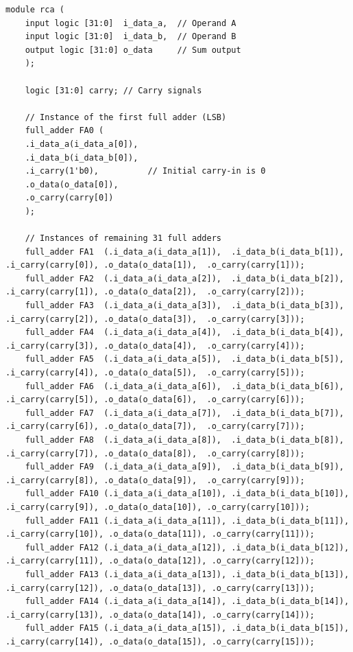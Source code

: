 \begin{lstlisting}[style = SystemVerilog, caption={RCA}]
	module rca (
	input logic [31:0]  i_data_a,  // Operand A
	input logic [31:0]  i_data_b,  // Operand B
	output logic [31:0] o_data     // Sum output
	);
	
	logic [31:0] carry; // Carry signals
	
	// Instance of the first full adder (LSB)
	full_adder FA0 (
	.i_data_a(i_data_a[0]),
	.i_data_b(i_data_b[0]),
	.i_carry(1'b0),          // Initial carry-in is 0
	.o_data(o_data[0]),
	.o_carry(carry[0])
	);
	
	// Instances of remaining 31 full adders
	full_adder FA1  (.i_data_a(i_data_a[1]),  .i_data_b(i_data_b[1]),  .i_carry(carry[0]), .o_data(o_data[1]),  .o_carry(carry[1]));
	full_adder FA2  (.i_data_a(i_data_a[2]),  .i_data_b(i_data_b[2]),  .i_carry(carry[1]), .o_data(o_data[2]),  .o_carry(carry[2]));
	full_adder FA3  (.i_data_a(i_data_a[3]),  .i_data_b(i_data_b[3]),  .i_carry(carry[2]), .o_data(o_data[3]),  .o_carry(carry[3]));
	full_adder FA4  (.i_data_a(i_data_a[4]),  .i_data_b(i_data_b[4]),  .i_carry(carry[3]), .o_data(o_data[4]),  .o_carry(carry[4]));
	full_adder FA5  (.i_data_a(i_data_a[5]),  .i_data_b(i_data_b[5]),  .i_carry(carry[4]), .o_data(o_data[5]),  .o_carry(carry[5]));
	full_adder FA6  (.i_data_a(i_data_a[6]),  .i_data_b(i_data_b[6]),  .i_carry(carry[5]), .o_data(o_data[6]),  .o_carry(carry[6]));
	full_adder FA7  (.i_data_a(i_data_a[7]),  .i_data_b(i_data_b[7]),  .i_carry(carry[6]), .o_data(o_data[7]),  .o_carry(carry[7]));
	full_adder FA8  (.i_data_a(i_data_a[8]),  .i_data_b(i_data_b[8]),  .i_carry(carry[7]), .o_data(o_data[8]),  .o_carry(carry[8]));
	full_adder FA9  (.i_data_a(i_data_a[9]),  .i_data_b(i_data_b[9]),  .i_carry(carry[8]), .o_data(o_data[9]),  .o_carry(carry[9]));
	full_adder FA10 (.i_data_a(i_data_a[10]), .i_data_b(i_data_b[10]), .i_carry(carry[9]), .o_data(o_data[10]), .o_carry(carry[10]));
	full_adder FA11 (.i_data_a(i_data_a[11]), .i_data_b(i_data_b[11]), .i_carry(carry[10]), .o_data(o_data[11]), .o_carry(carry[11]));
	full_adder FA12 (.i_data_a(i_data_a[12]), .i_data_b(i_data_b[12]), .i_carry(carry[11]), .o_data(o_data[12]), .o_carry(carry[12]));
	full_adder FA13 (.i_data_a(i_data_a[13]), .i_data_b(i_data_b[13]), .i_carry(carry[12]), .o_data(o_data[13]), .o_carry(carry[13]));
	full_adder FA14 (.i_data_a(i_data_a[14]), .i_data_b(i_data_b[14]), .i_carry(carry[13]), .o_data(o_data[14]), .o_carry(carry[14]));
	full_adder FA15 (.i_data_a(i_data_a[15]), .i_data_b(i_data_b[15]), .i_carry(carry[14]), .o_data(o_data[15]), .o_carry(carry[15]));

\end{lstlisting}
